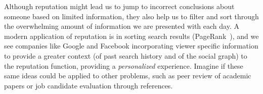 Although reputation might lead us to jump to incorrect conclusions about
someone based on limited information, they also help us to filter and
sort through the overwhelming amount of information we are presented
with each day.
A modern application of reputation is in sorting search
results (\eg PageRank~\cite{Page1999}), and we see companies
like Google and Facebook incorporating viewer specific information
to provide a greater context (of past search history and of
the social graph) to the reputation function, providing a
\textit{personalized} experience.
Imagine if these same ideas could be applied to other
problems, such as peer review of academic papers or
job candidate evaluation through references.

